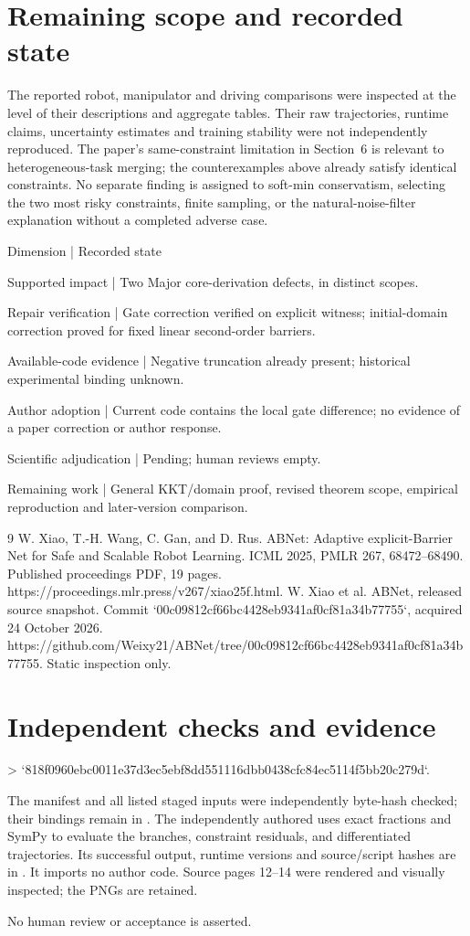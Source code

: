 \documentclass[10pt]{article}
\begin{document}
\section*{Remaining scope and recorded state}
The reported robot, manipulator and driving comparisons were inspected at the level of their descriptions and aggregate tables. Their raw trajectories, runtime claims, uncertainty estimates and training stability were not independently reproduced. The paper’s same-constraint limitation in Section 6 is relevant to heterogeneous-task merging; the counterexamples above already satisfy identical constraints. No separate finding is assigned to soft-min conservatism, selecting the two most risky constraints, finite sampling, or the natural-noise-filter explanation without a completed adverse case.\par
Dimension | Recorded state\par
Supported impact | Two Major core-derivation defects, in distinct scopes.\par
Repair verification | Gate correction verified on explicit witness; initial-domain correction proved for fixed linear second-order barriers.\par
Available-code evidence | Negative truncation already present; historical experimental binding unknown.\par
Author adoption | Current code contains the local gate difference; no evidence of a paper correction or author response.\par
Scientific adjudication | Pending; human reviews empty.\par
Remaining work | General KKT/domain proof, revised theorem scope, empirical reproduction and later-version comparison.\par
9 W. Xiao, T.-H. Wang, C. Gan, and D. Rus. ABNet: Adaptive explicit-Barrier Net for Safe and Scalable Robot Learning. ICML 2025, PMLR 267, 68472–68490. Published proceedings PDF, 19 pages. https://proceedings.mlr.press/v267/xiao25f.html. W. Xiao et al. ABNet, released source snapshot. Commit `00c09812cf66bc4428eb9341af0cf81a34b77755`, acquired 24 October 2026. https://github.com/Weixy21/ABNet/tree/00c09812cf66bc4428eb9341af0cf81a34b77755. Static inspection only.\par
\section*{Independent checks and evidence}
> `818f0960ebc0011e37d3ec5ebf8dd551116dbb0438cfc84ec5114f5bb20c279d`.\par
The manifest and all listed staged inputs were independently byte-hash checked; their bindings remain in . The independently authored uses exact fractions and SymPy to evaluate the branches, constraint residuals, and differentiated trajectories. Its successful output, runtime versions and source/script hashes are in . It imports no author code. Source pages 12–14 were rendered and visually inspected; the PNGs are retained.\par
No human review or acceptance is asserted.\par
\end{document}
